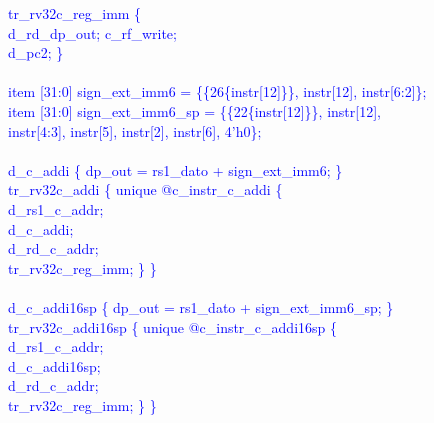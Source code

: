 \textcolor{blue}{
\indent tr\_rv32c\_reg\_imm \{\\%
\indent \hspace{\parindent} d\_rd\_dp\_out; c\_rf\_write;  \\%
\indent \hspace{\parindent} d\_pc2; \}\\%
\\
\indent item [31:0] sign\_ext\_imm6 = \{\{26\{instr[12]\}\}, instr[12], instr[6:2]\};\\%
\indent item [31:0] sign\_ext\_imm6\_sp = \{\{22\{instr[12]\}\}, instr[12],\\%
\indent \hspace{\parindent} \hspace{\parindent} \hspace{\parindent} instr[4:3], instr[5], instr[2], instr[6], 4'h0\};\\%
\\
\indent d\_c\_addi \{ dp\_out = rs1\_dato + sign\_ext\_imm6; \}\\%
\indent tr\_rv32c\_addi \{ unique @c\_instr\_c\_addi \{\\%
\indent \hspace{\parindent} d\_rs1\_c\_addr; \\%
\indent \hspace{\parindent} d\_c\_addi; \\%
\indent \hspace{\parindent} d\_rd\_c\_addr;\\%
\indent \hspace{\parindent} tr\_rv32c\_reg\_imm; \} \} \\%
\\
\indent d\_c\_addi16sp \{ dp\_out = rs1\_dato + sign\_ext\_imm6\_sp; \}\\%
\indent tr\_rv32c\_addi16sp \{ unique @c\_instr\_c\_addi16sp \{ \\%
\indent \hspace{\parindent} d\_rs1\_c\_addr; \\%
\indent \hspace{\parindent} d\_c\_addi16sp; \\%
\indent \hspace{\parindent} d\_rd\_c\_addr;\\%
\indent \hspace{\parindent} tr\_rv32c\_reg\_imm; \} \} \\%
}

